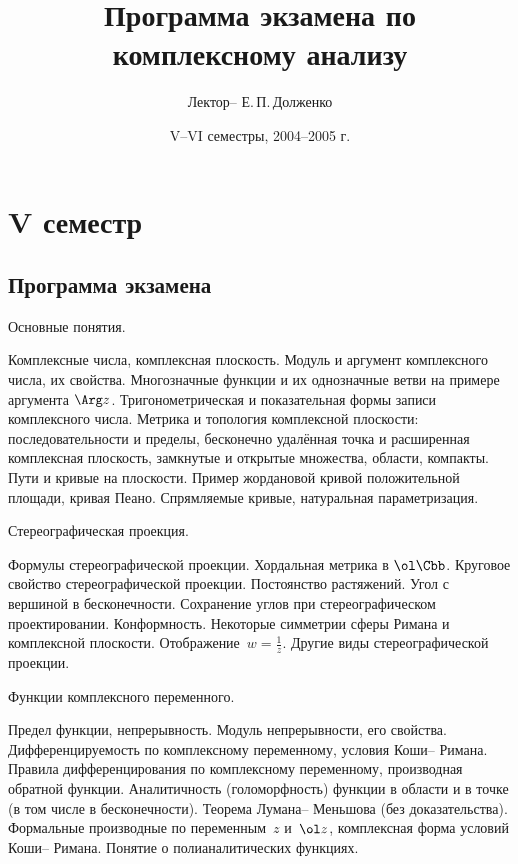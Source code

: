 \documentclass[a4paper]{article}
\title{Программа экзамена по комплексному анализу}
\author{Лектор-- Е.\,П.\,Долженко}
\date{V--VI семестры, 2004--2005 г.}
\begin{document}
\maketitle

\section*{V семестр}

\subsection*{Программа экзамена}

\begin{nums}{-2}
\item Основные понятия.

Комплексные числа, комплексная плоскость. Модуль и аргумент комплексного числа,
их свойства. Многозначные функции и их однозначные ветви на примере аргумента $\Arg z$.
Тригонометрическая и показательная формы записи комплексного числа. Метрика и топология комплексной плоскости:
последовательности и пределы, бесконечно удалённая точка и расширенная комплексная плоскость,
замкнутые и открытые множества, области, компакты. Пути и кривые на плоскости. Пример жордановой кривой
положительной площади, кривая Пеано. Спрямляемые кривые, натуральная параметризация.

\item Стереографическая проекция.

Формулы стереографической проекции. Хордальная метрика в $\ol \Cbb$.
Круговое свойство стереографической проекции. Постоянство растяжений. Угол с вершиной в бесконечности.
Сохранение углов при стереографическом проектировании. Конформность. Некоторые симметрии сферы Римана и
комплексной плоскости. Отображение~${w = \frac1z}$. Другие виды стереографической проекции.

\item Функции комплексного переменного.

Предел функции, непрерывность. Модуль
непрерывности, его свойства. Дифференцируемость по комплексному переменному, условия Коши-- Римана. Правила
дифференцирования по комплексному переменному, производная обратной функции. Аналитичность (голоморфность)
функции в области и в точке (в том числе в бесконечности). Теорема Лумана-- Меньшова (без доказательства).
Формальные производные по переменным~$z$ и~$\ol z$, комплексная форма условий Коши-- Римана. Понятие
о полианалитических функциях.


\end{nums}
\end{document}
